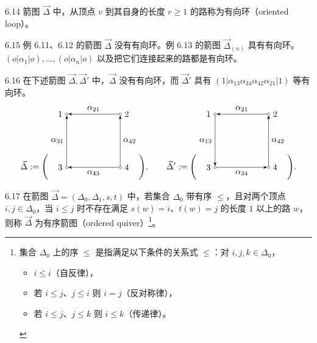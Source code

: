 \begin{definition}{6.14}
箭图 $\vec{\Delta}$ 中，从顶点 $v$ 到其自身的长度 $r\ge 1$ 的路称为有向环（oriented loop）。
\end{definition}

\begin{example}{6.15}
例 6.11、6.12 的箭图 $\vec{\Delta}$ 没有有向环。例 6.13 的箭图 $\vec{\Delta}_{(n)}$ 具有有向环。$(o|\alpha_1|o),\dots,(o|\alpha_n|o)$ 以及把它们连接起来的路都是有向环。
\end{example}

\begin{example}{6.16}
在下述箭图 $\vec{\Delta},\vec{\Delta}'$ 中，$\vec{\Delta}$ 没有有向环，而 $\vec{\Delta}'$ 具有 $(1|\alpha_{13}\alpha_{34}\alpha_{42}\alpha_{21}|1)$ 等有向环。
\[
\vec{\Delta} :=
\Biggl(
\begin{tikzpicture}[baseline=-0.5ex]
  \node[draw,circle,inner sep=1pt,label=left:{$1$}] (v1) at (0,2.2) {};
  \node[draw,circle,inner sep=1pt,label=right:{$2$}] (v2) at (2.2,2.2) {};
  \node[draw,circle,inner sep=1pt,label=left:{$3$}] (v3) at (0,0) {};
  \node[draw,circle,inner sep=1pt,label=right:{$4$}] (v4) at (2.2,0) {};
  \draw[-{Stealth}] (v2) -- node[above]{$\alpha_{21}$} (v1);
  \draw[-{Stealth}] (v3) -- node[left]{$\alpha_{31}$} (v1);
  \draw[-{Stealth}] (v4) -- node[right]{$\alpha_{42}$} (v2);
  \draw[-{Stealth}] (v4) -- node[below]{$\alpha_{43}$} (v3);
\end{tikzpicture}
\Biggr),\qquad
\vec{\Delta}' :=
\Biggl(
\begin{tikzpicture}[baseline=-0.5ex]
  \node[draw,circle,inner sep=1pt,label=left:{$1$}] (w1) at (0,2.2) {};
  \node[draw,circle,inner sep=1pt,label=right:{$2$}] (w2) at (2.2,2.2) {};
  \node[draw,circle,inner sep=1pt,label=left:{$3$}] (w3) at (0,0) {};
  \node[draw,circle,inner sep=1pt,label=right:{$4$}] (w4) at (2.2,0) {};
  \draw[-{Stealth}] (w2) -- node[above]{$\alpha_{21}$} (w1);
  \draw[-{Stealth}] (w1) -- node[left]{$\alpha_{13}$} (w3);
  \draw[-{Stealth}] (w4) -- node[right]{$\alpha_{42}$} (w2);
  \draw[-{Stealth}] (w3) -- node[below]{$\alpha_{34}$} (w4);
\end{tikzpicture}
\Biggr).
\]
\end{example}

\begin{definition}{6.17}
在箭图 $\vec{\Delta}=(\Delta_0,\Delta_1,s,t)$ 中，若集合 $\Delta_0$ 带有序 $\le$，且对两个顶点 $i,j\in\Delta_0$，当 $i\le j$ 时不存在满足 $s(w)=i$、$t(w)=j$ 的长度 $1$ 以上的路 $w$，则称 $\vec{\Delta}$ 为有序箭图（ordered quiver）\footnote{集合 $\Delta_0$ 上的序 $\le$ 是指满足以下条件的关系式 $\le$：对 $i,j,k\in\Delta_0$，\begin{itemize}[leftmargin=1.6em,itemsep=0pt,topsep=1pt]\item $i\le i$（自反律），\item 若 $i\le j$、$j\le i$ 则 $i=j$（反对称律），\item 若 $i\le j$、$j\le k$ 则 $i\le k$（传递律）。\end{itemize}}。
\end{definition}

